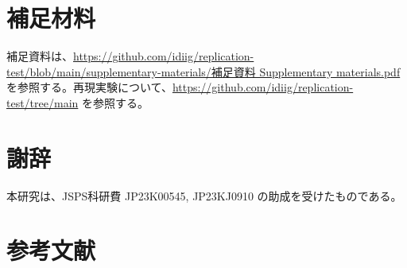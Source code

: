 \documentclass[
  letterpaper,
  DIV=11,
  numbers=noendperiod]{scrartcl}
\begin{document}
\section*{補足材料}\label{ux88dcux8db3ux6750ux6599}

補足資料は、\href{https://github.com/idiig/replication-test/blob/main/supplementary-materials/補足資料\%20Supplementary\%20materials.pdf}{https://github.com/idiig/replication-test/blob/main/supplementary-materials/補足資料
Supplementary materials.pdf}
を参照する。再現実験について、\url{https://github.com/idiig/replication-test/tree/main}
を参照する。

\section*{謝辞}\label{ux8b1dux8f9e}

本研究は、JSPS科研費 JP23K00545, JP23KJ0910 の助成を受けたものである。

\section*{参考文献}\label{ux53c2ux8003ux6587ux732e}
\end{document}

